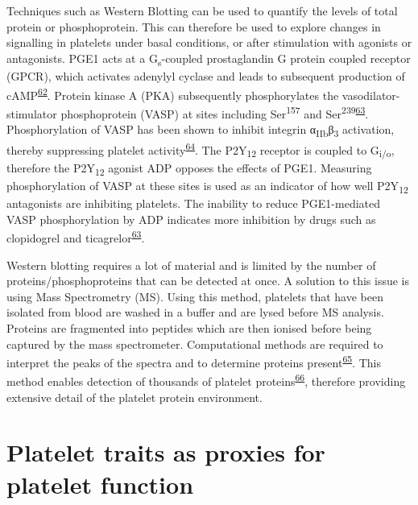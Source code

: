 \documentclass[11pt,twoside]{bristolthesis}
\begin{document}
Techniques such as Western Blotting can be used to quantify the levels of total protein or phosphoprotein. This can therefore be used to explore changes in signalling in platelets under basal conditions, or after stimulation with agonists or antagonists. PGE1 acts at a G\textsubscript{s}-coupled prostaglandin G protein coupled receptor (GPCR), which activates adenylyl cyclase and leads to subsequent production of cAMP\textsuperscript{\protect\hyperlink{ref-Braune2020}{62}}. Protein kinase A (PKA) subsequently phosphorylates the vasodilator-stimulator phosphoprotein (VASP) at sites including Ser\textsuperscript{157} and Ser\textsuperscript{239}\textsuperscript{\protect\hyperlink{ref-Hezard2005}{63}}. Phosphorylation of VASP has been shown to inhibit integrin α\textsubscript{IIb}β\textsubscript{3} activation, thereby suppressing platelet activity\textsuperscript{\protect\hyperlink{ref-Horstrup1994}{64}}. The P2Y\textsubscript{12} receptor is coupled to G\textsubscript{i/o}, therefore the P2Y\textsubscript{12} agonist ADP opposes the effects of PGE1. Measuring phosphorylation of VASP at these sites is used as an indicator of how well P2Y\textsubscript{12} antagonists are inhibiting platelets. The inability to reduce PGE1-mediated VASP phosphorylation by ADP indicates more inhibition by drugs such as clopidogrel and ticagrelor\textsuperscript{\protect\hyperlink{ref-Hezard2005}{63}}.

Western blotting requires a lot of material and is limited by the number of proteins/phosphoproteins that can be detected at once. A solution to this issue is using Mass Spectrometry (MS). Using this method, platelets that have been isolated from blood are washed in a buffer and are lysed before MS analysis. Proteins are fragmented into peptides which are then ionised before being captured by the mass spectrometer. Computational methods are required to interpret the peaks of the spectra and to determine proteins present\textsuperscript{\protect\hyperlink{ref-Wang2013}{65}}. This method enables detection of thousands of platelet proteins\textsuperscript{\protect\hyperlink{ref-Huang2021}{66}}, therefore providing extensive detail of the platelet protein environment.

\hypertarget{platelet-traits-as-proxies-for-platelet-function}{%
\section{Platelet traits as proxies for platelet function}\label{platelet-traits-as-proxies-for-platelet-function}}
\end{document}
